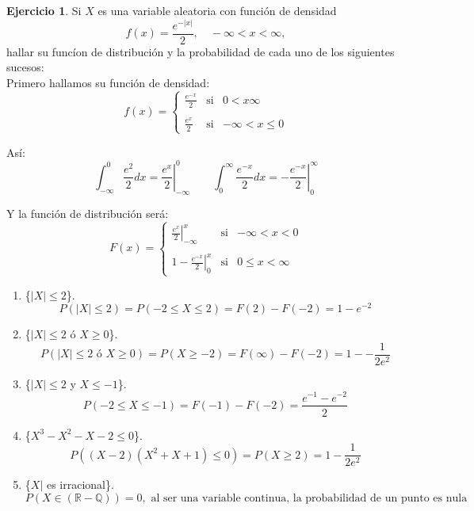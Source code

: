 \documentclass[a4paper, 12pt]{article}
\theoremstyle{definition}
\newtheorem{ej}{Ejercicio}
\begin{document}
\begin{ej}
Si \(X\) es una variable aleatoria con función de densidad
\[
	f(x) = \frac{e^{-|x|}}{2}, \quad - \infty < x < \infty,
\]
hallar su funcíon de distribución y la probabilidad de cada uno de los siguientes sucesos: \\

Primero hallamos su función de densidad:
\[
	f(x) = \left\{ \begin{array}{ccc}
	\frac{e^{-x}}{2} & \text{si} & 0 < x \infty \\
	\\
	\frac{e^x}{2} & \text{si} & - \infty < x \leq 0
	\end{array} \right.
\]

Así:
\[
	\int_{-\infty}^{0} \frac{e^2}{2} dx = \left. \frac{e^x}{2} \right|_{-\infty}^{0} \qquad \int_{0}^{\infty} \frac{e^{-x}}{2} dx = \left. - \frac{e^{-x}}{2} \right|_{0}^{\infty}
\]

Y la función de distribución será:
\[
	F(x) = \left\{ \begin{array}{ccc}
	\left. \frac{e^x}{2} \right|_{-\infty}^{x} & \text{si} & - \infty < x < 0 \\
	\\
	\left. 1 - \frac{e^{-x}}{2} \right|_{0}^{x} & \text{si} & 0 \leq x < \infty
	\end{array} \right.
\]

\begin{enumerate}[label=\alph*)]
	\item \{\(|X| \leq 2\)\}.
\[
	P(|X| \leq 2) = P(-2 \leq X \leq 2) = F(2) - F(-2) = 1 - e^{-2}
\]

	\item \{\(|X| \leq 2\) ó \(X \geq 0\)\}.
\[
	P(|X| \leq 2 \text{ ó } X \geq 0) = P(X \geq -2) = F(\infty) - F(-2) = 1 - - \frac{1}{2e^2}
\]

	\item \{\(|X| \leq 2\) y \(X \leq -1\)\}.
\[
	P(-2 \leq X \leq -1) = F(-1) - F(-2) = \frac{e^{-1}-e^{-2}}{2}
\]

	\item \{\(X^3 - X^2 - X - 2 \leq 0\)\}.
\[
	P((X-2)(X^2 + X + 1) \leq 0) = P(X \geq 2) = 1 - \frac{1}{2e^2}
\]

	\item \{\(X|\) es irracional\}.
\[
	P(X \in (\mathbb{R} - \mathbb{Q})) = 0, \text{ al ser una variable continua, la probabilidad de un punto es nula}
\]
\end{enumerate}
\end{ej}
\end{document}

